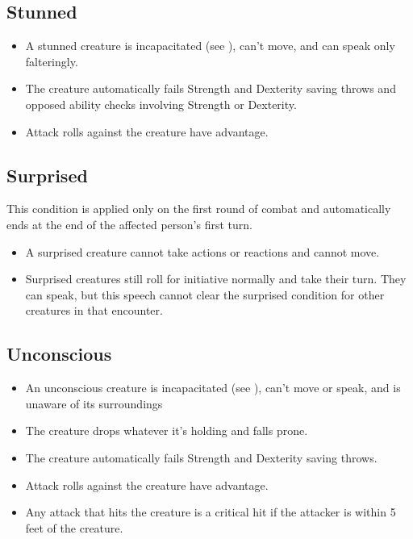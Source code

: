 \subsection{Stunned\label{condition:stunned}}
\begin{itemize}
\item A stunned creature is incapacitated (see ), can't move, and can speak only falteringly.
\item The creature automatically fails Strength and Dexterity saving throws and opposed ability checks involving Strength or Dexterity.
\item Attack rolls against the creature have advantage.
\end{itemize}

\subsection{Surprised}\label{condition:surprised}
This condition is applied only on the first round of combat and automatically ends at the end of the affected person's first turn.
\begin{itemize}
	\item A surprised creature cannot take actions or reactions and cannot move. 
	\item Surprised creatures still roll for initiative normally and take their turn. They can speak, but this speech cannot clear the surprised condition for other creatures in that encounter.
\end{itemize}

\subsection{Unconscious\label{condition:unconscious}}
\begin{itemize}
\item An unconscious creature is incapacitated (see ), can't move or speak, and is unaware of its surroundings
\item The creature drops whatever it's holding and falls prone.
\item The creature automatically fails Strength and Dexterity saving throws.
\item Attack rolls against the creature have advantage.
\item Any attack that hits the creature is a critical hit if the attacker is within 5 feet of the creature.
\end{itemize}